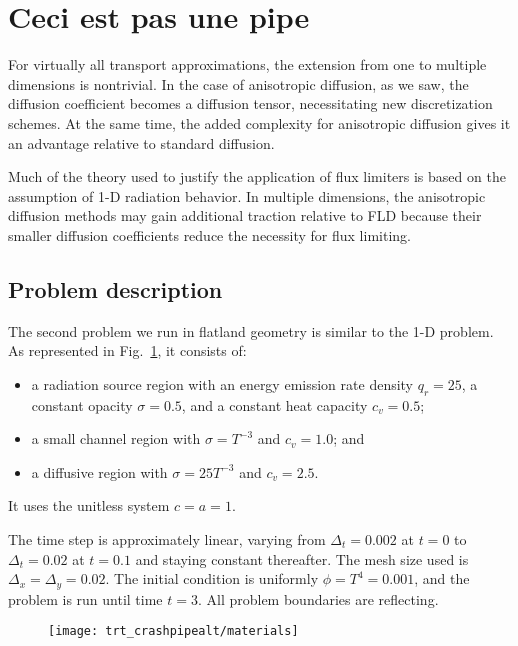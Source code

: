 \section{Ceci est pas une pipe}

For virtually all transport approximations, the extension from one to multiple
dimensions is nontrivial. In the case of anisotropic diffusion, as we saw, the
diffusion coefficient becomes a diffusion tensor, necessitating new
discretization schemes. At the same time, the added complexity for anisotropic
diffusion gives it an advantage relative to standard diffusion.

Much of the theory used to justify the application of flux limiters is based on
the assumption of 1-D radiation behavior. In multiple dimensions, the
anisotropic diffusion methods may gain additional traction relative to FLD
because their smaller diffusion coefficients reduce the necessity for flux
limiting.

\subsection{Problem description}

The second problem we run in flatland geometry is similar to the 1-D problem. As
represented in Fig.~\ref{fig:crashaltMaterials}, it consists of:
\begin{itemize}
  \item a radiation source region with an energy emission rate density $q_r=25$, 
    a constant opacity $\sigma=0.5$, and a constant heat capacity $c_v=0.5$;
  \item a small channel region with $\sigma = T^{-3}$ and $c_v=1.0$; and
  \item a diffusive region with $\sigma = 25 T^{-3}$ and $c_v=2.5$.
\end{itemize}
It uses the unitless system $c=a=1$.

The time step is approximately linear, varying from $\Delta_t=0.002$ at $t=0$ to
$\Delta_t=0.02$ at $t=0.1$ and staying constant thereafter. The mesh size used
is $\Delta_x=\Delta_y=0.02$. The initial condition is uniformly $\phi = T^4 = 0.001$, and
the problem is run until time $t=3$. All problem boundaries are reflecting.

\begin{figure}[htb]
  \centering
  \texttt{[image: trt\_crashpipealt/materials]}
  \label{fig:crashaltMaterials}
\end{figure}

